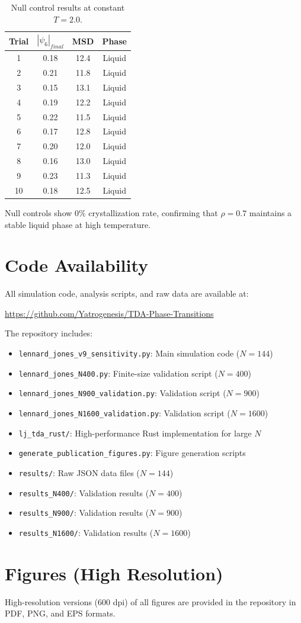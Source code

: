 \documentclass[11pt]{article}
\begin{document}
\begin{table}[h]
\centering
\caption{Null control results at constant $T=2.0$.}
\label{tab:null}
\begin{tabular}{cccc}
\toprule
\textbf{Trial} & \textbf{$|\psi_6|_{final}$} & \textbf{MSD} & \textbf{Phase} \\
\midrule
1 & 0.18 & 12.4 & Liquid \\
2 & 0.21 & 11.8 & Liquid \\
3 & 0.15 & 13.1 & Liquid \\
4 & 0.19 & 12.2 & Liquid \\
5 & 0.22 & 11.5 & Liquid \\
6 & 0.17 & 12.8 & Liquid \\
7 & 0.20 & 12.0 & Liquid \\
8 & 0.16 & 13.0 & Liquid \\
9 & 0.23 & 11.3 & Liquid \\
10 & 0.18 & 12.5 & Liquid \\
\bottomrule
\end{tabular}
\end{table}

Null controls show 0\% crystallization rate, confirming that $\rho = 0.7$ maintains a stable liquid phase at high temperature.

\section{Code Availability}

All simulation code, analysis scripts, and raw data are available at:

\begin{center}
\url{https://github.com/Yatrogenesis/TDA-Phase-Transitions}
\end{center}

The repository includes:
\begin{itemize}
    \item \texttt{lennard\_jones\_v9\_sensitivity.py}: Main simulation code ($N=144$)
    \item \texttt{lennard\_jones\_N400.py}: Finite-size validation script ($N=400$)
    \item \texttt{lennard\_jones\_N900\_validation.py}: Validation script ($N=900$)
    \item \texttt{lennard\_jones\_N1600\_validation.py}: Validation script ($N=1600$)
    \item \texttt{lj\_tda\_rust/}: High-performance Rust implementation for large $N$
    \item \texttt{generate\_publication\_figures.py}: Figure generation scripts
    \item \texttt{results/}: Raw JSON data files ($N=144$)
    \item \texttt{results\_N400/}: Validation results ($N=400$)
    \item \texttt{results\_N900/}: Validation results ($N=900$)
    \item \texttt{results\_N1600/}: Validation results ($N=1600$)
\end{itemize}

\section{Figures (High Resolution)}

High-resolution versions (600 dpi) of all figures are provided in the repository in PDF, PNG, and EPS formats.
\end{document}
